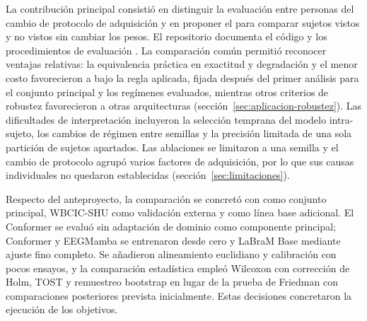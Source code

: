 La contribución principal consistió en distinguir la evaluación entre personas del cambio de
protocolo de adquisición y en proponer el \dsi{} para comparar sujetos vistos y no vistos
sin cambiar los pesos. El repositorio documenta el código y los procedimientos de evaluación
\cite{ayala2026repo}. La comparación común permitió reconocer ventajas relativas: la
equivalencia práctica en exactitud y degradación y el menor costo favorecieron a \eegnet{}
bajo la regla aplicada, fijada después del primer análisis para el conjunto principal y los
regímenes evaluados, mientras otros criterios de robustez favorecieron a otras arquitecturas
(sección~\ref{sec:aplicacion-robustez}). Las dificultades de interpretación incluyeron la
selección temprana del modelo intra-sujeto, los cambios de régimen entre semillas y la
precisión limitada de una sola partición de sujetos apartados. Las ablaciones se limitaron
a una semilla y el cambio de protocolo agrupó varios factores de adquisición, por lo que sus
causas individuales no quedaron establecidas (sección~\ref{sec:limitaciones}).

Respecto del anteproyecto, la comparación se concretó con \openbmi{} como conjunto principal,
WBCIC-SHU como validación externa y \eegnet{} como línea base adicional. El Conformer se
evaluó sin adaptación de dominio como componente principal; Conformer y EEGMamba se
entrenaron desde cero y LaBraM Base mediante ajuste fino completo. Se añadieron alineamiento
euclidiano y calibración con pocos ensayos, y la comparación estadística empleó Wilcoxon con
corrección de Holm, TOST y remuestreo bootstrap en lugar de la prueba de Friedman con
comparaciones posteriores prevista inicialmente. Estas decisiones concretaron la ejecución
de los objetivos.
